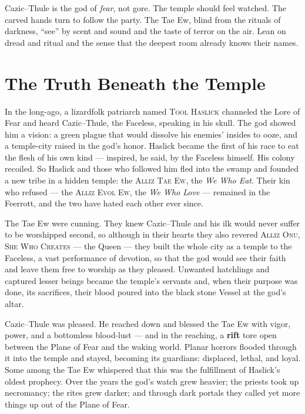 \documentclass[10pt,twoside]{article}
\newcommand{\eqname}[1]{\textsc{#1}}
\begin{document}
\begin{dmnote}
Cazic--Thule is the god of \emph{fear}, not gore. The temple should feel watched.
The carved hands turn to follow the party. The Tae Ew, blind from the rituals of
darkness, ``see'' by scent and sound and the taste of terror on the air. Lean on
dread and ritual and the sense that the deepest room already knows their names.
\end{dmnote}
\clearpage

\section*{The Truth Beneath the Temple}

In the long-ago, a lizardfolk patriarch named \eqname{Tool Haslick} channeled the
Lore of Fear and heard Cazic--Thule, the Faceless, speaking in his skull. The god
showed him a vision: a green plague that would dissolve his enemies' insides to
ooze, and a temple-city raised in the god's honor. Haslick became the first of his
race to eat the flesh of his own kind --- inspired, he said, by the Faceless
himself. His colony recoiled. So Haslick and those who followed him fled into the
swamp and founded a new tribe in a hidden temple: the \eqname{Alliz Tae Ew}, the
\emph{We Who Eat}. Their kin who refused --- the \eqname{Alliz Evol Ew}, the
\emph{We Who Love} --- remained in the Feerrott, and the two have hated each other
ever since.

The Tae Ew were cunning. They knew Cazic--Thule and his ilk would never suffer to
be worshipped second, so although in their hearts they also revered \eqname{Alliz
Onu, She Who Creates} --- the Queen --- they built the whole city as a temple to the
Faceless, a vast performance of devotion, so that the god would see their faith and
leave them free to worship as they pleased. Unwanted hatchlings and captured lesser
beings became the temple's servants and, when their purpose was done, its
sacrifices, their blood poured into the black stone Vessel at the god's altar.

Cazic--Thule was pleased. He reached down and blessed the Tae Ew with vigor, power,
and a bottomless blood-lust --- and in the reaching, a \textbf{rift} tore open
between the Plane of Fear and the waking world. Planar horrors flooded through it
into the temple and stayed, becoming its guardians: displaced, lethal, and loyal.
Some among the Tae Ew whispered that this was the fulfillment of Haslick's oldest
prophecy. Over the years the god's watch grew heavier; the priests took up
necromancy; the rites grew darker; and through dark portals they called yet more
things up out of the Plane of Fear.
\end{document}
